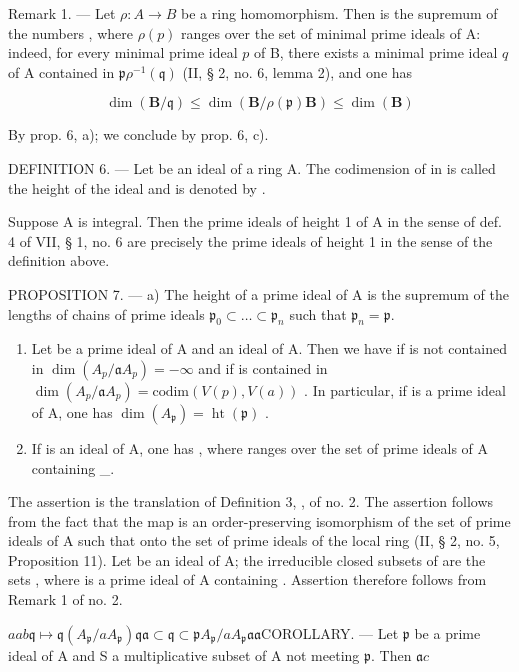 Remark 1. --- Let \(\rho: A \to B\) be a ring homomorphism. Then  is the supremum of the numbers , where \(\rho(p)\) ranges over the set of minimal prime ideals of A: indeed, for every minimal prime ideal \(p\) of B, there exists a minimal prime ideal \(q\) of A contained in \(\mathfrak{p}\)\(\rho^{-1}(\mathfrak{q})\) (II, § 2, no. 6, lemma 2), and one has

\[
\dim (\mathbf {B} / \mathfrak {q}) \leqslant \dim (\mathbf {B} / \rho (\mathfrak {p})\mathbf {B}) \leqslant \dim (\mathbf {B})
\]

By prop. 6, a); we conclude by prop. 6, c).

DEFINITION 6. --- Let  be an ideal of a ring A. The codimension of  in  is called the height of the ideal  and is denoted by .

Suppose A is integral. Then the prime ideals of height 1 of A in the sense of def. 4 of VII, § 1, no. 6 are precisely the prime ideals of height 1 in the sense of the definition above.

PROPOSITION 7. --- a) The height of a prime ideal  of A is the supremum of the lengths of chains of prime ideals \(\mathfrak{p}_{0} \subset \ldots \subset \mathfrak{p}_{n}\) such that \(\mathfrak{p}_{n} = \mathfrak{p}\).

\begin{enumerate}
\def\labelenumi{\alph{enumi})}
\setcounter{enumi}{1}
\item
  Let  be a prime ideal of A and  an ideal of A. Then we have  if  is not contained in \(\dim(A_{p}/\mathfrak{a}A_{p}) = -\infty\) and  if  is contained in \(\dim(A_{p}/\mathfrak{a}A_{p}) = \text{codim}(V(p), V(a))\) . In particular, if  is a prime ideal of A, one has \(\dim(A_{\mathfrak{p}}) = \operatorname{ht}(\mathfrak{p})\) .
\item
  If  is an ideal of A, one has , where  ranges over the set of prime ideals of A containing \_.
\end{enumerate}

The assertion  is the translation of Definition 3, , of no. 2. The assertion  follows from the fact that the map  is an order-preserving isomorphism of the set of prime ideals  of A such that  onto the set of prime ideals of the local ring  (II, § 2, no. 5, Proposition 11). Let  be an ideal of A; the irreducible closed subsets of  are the sets , where  is a prime ideal of A containing . Assertion  therefore follows from Remark 1 of no. 2.

\(a\)\(a\)\(b\)\(\mathfrak{q} \mapsto \mathfrak{q}(A_{\mathfrak{p}} / aA_{\mathfrak{p}})\)\(\mathfrak{q}\)\(\mathfrak{a} \subset \mathfrak{q} \subset \mathfrak{p}\)\(A_{\mathfrak{p}} / aA_{\mathfrak{p}}\)\(\mathfrak{a}\)\(\mathfrak{a}\)COROLLARY. --- Let \(\mathfrak{p}\) be a prime ideal of A and S a multiplicative subset of A not meeting \(\mathfrak{p}\). Then \(\mathfrak{a}\)\(c\)

